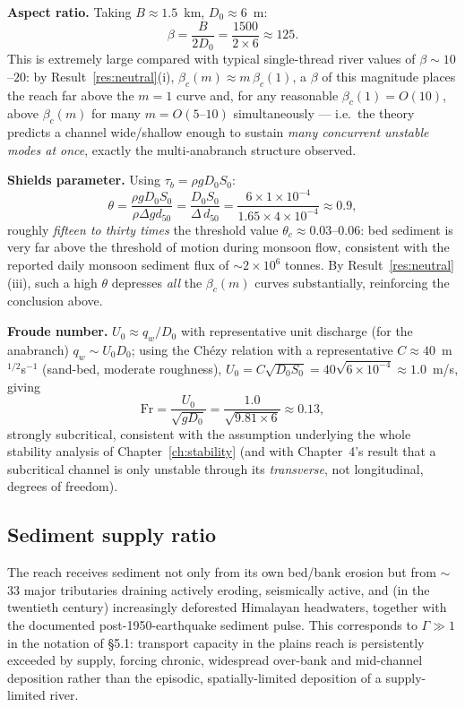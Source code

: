 \documentclass[11pt,a4paper]{report}
\theoremstyle{definition}
\theoremstyle{plain}
\theoremstyle{remark}
\newcommand{\Fr}{\mathrm{Fr}}
\begin{document}
\textbf{Aspect ratio.} Taking $B\approx1.5$~km, $D_0\approx6$~m:
\begin{equation}
\beta = \frac{B}{2D_0} = \frac{1500}{2\times6} \approx 125.
\end{equation}
This is extremely large compared with typical single-thread river values of $\beta\sim10$--$20$: by Result~\ref{res:neutral}(i), $\beta_c(m)\approx m\,\beta_c(1)$, a $\beta$ of this magnitude places the reach far above the $m=1$ curve and, for any reasonable $\beta_c(1)=O(10)$, above $\beta_c(m)$ for many $m=O(5\text{--}10)$ simultaneously — i.e.\ the theory predicts a channel wide/shallow enough to sustain \emph{many concurrent unstable modes at once}, exactly the multi-anabranch structure observed.

\textbf{Shields parameter.} Using $\tau_b=\rho g D_0 S_0$:
\begin{equation}
\theta = \frac{\rho g D_0 S_0}{\rho\Delta g d_{50}} = \frac{D_0 S_0}{\Delta\, d_{50}} = \frac{6\times1\times10^{-4}}{1.65\times4\times10^{-4}} \approx 0.9,
\end{equation}
roughly \emph{fifteen to thirty times} the threshold value $\theta_c\approx0.03$--$0.06$: bed sediment is very far above the threshold of motion during monsoon flow, consistent with the reported daily monsoon sediment flux of $\sim2\times10^6$ tonnes. By Result~\ref{res:neutral}(iii), such a high $\theta$ depresses \emph{all} the $\beta_c(m)$ curves substantially, reinforcing the conclusion above.

\textbf{Froude number.} $U_0\approx q_w/D_0$ with representative unit discharge (for the anabranch) $q_w\sim U_0 D_0$; using the Chézy relation with a representative $C\approx40$~m$^{1/2}$s$^{-1}$ (sand-bed, moderate roughness), $U_0=C\sqrt{D_0S_0}=40\sqrt{6\times10^{-4}}\approx1.0$~m/s, giving
\begin{equation}
\Fr = \frac{U_0}{\sqrt{gD_0}} = \frac{1.0}{\sqrt{9.81\times6}} \approx 0.13,
\end{equation}
strongly subcritical, consistent with the assumption underlying the whole stability analysis of Chapter~\ref{ch:stability} (and with Chapter~4's result that a subcritical channel is only unstable through its \emph{transverse}, not longitudinal, degrees of freedom).

\subsection{Sediment supply ratio}
The reach receives sediment not only from its own bed/bank erosion but from $\sim$33 major tributaries draining actively eroding, seismically active, and (in the twentieth century) increasingly deforested Himalayan headwaters, together with the documented post-1950-earthquake sediment pulse. This corresponds to $\Gamma\gg1$ in the notation of \S5.1: transport capacity in the plains reach is persistently exceeded by supply, forcing chronic, widespread over-bank and mid-channel deposition rather than the episodic, spatially-limited deposition of a supply-limited river.
\end{document}
